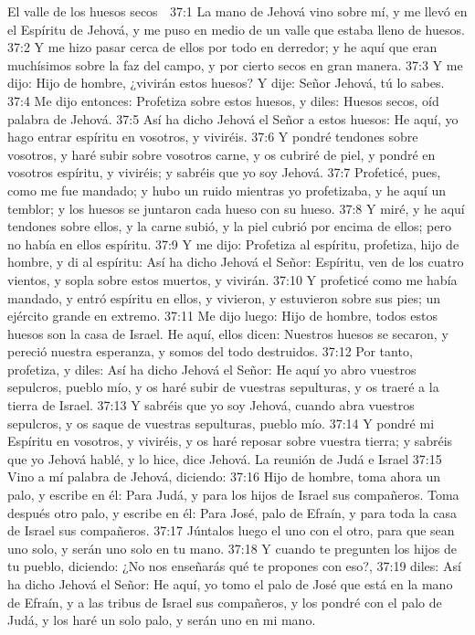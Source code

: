 El valle de los huesos secos  

37:1 La mano de Jehová vino sobre mí, y me llevó en el Espíritu de Jehová, y me puso en medio de un valle que estaba lleno de huesos.  
37:2 Y me hizo pasar cerca de ellos por todo en derredor; y he aquí que eran muchísimos sobre la faz del campo, y por cierto secos en gran manera.  
37:3 Y me dijo: Hijo de hombre, ¿vivirán estos huesos? Y dije: Señor Jehová, tú lo sabes.  
37:4 Me dijo entonces: Profetiza sobre estos huesos, y diles: Huesos secos, oíd palabra de Jehová.  
37:5 Así ha dicho Jehová el Señor a estos huesos: He aquí, yo hago entrar espíritu en vosotros, y viviréis.  
37:6 Y pondré tendones sobre vosotros, y haré subir sobre vosotros carne, y os cubriré de piel, y pondré en vosotros espíritu, y viviréis; y sabréis que yo soy Jehová.  
37:7 Profeticé, pues, como me fue mandado; y hubo un ruido mientras yo profetizaba, y he aquí un temblor; y los huesos se juntaron cada hueso con su hueso.  
37:8 Y miré, y he aquí tendones sobre ellos, y la carne subió, y la piel cubrió por encima de ellos; pero no había en ellos espíritu.  
37:9 Y me dijo: Profetiza al espíritu, profetiza, hijo de hombre, y di al espíritu: Así ha dicho Jehová el Señor: Espíritu, ven de los cuatro vientos, y sopla sobre estos muertos, y vivirán. 
37:10 Y profeticé como me había mandado, y entró espíritu en ellos, y vivieron, y estuvieron sobre sus pies; un ejército grande en extremo.  
37:11 Me dijo luego: Hijo de hombre, todos estos huesos son la casa de Israel. He aquí, ellos dicen: Nuestros huesos se secaron, y pereció nuestra esperanza, y somos del todo destruidos.  
37:12 Por tanto, profetiza, y diles: Así ha dicho Jehová el Señor: He aquí yo abro vuestros sepulcros, pueblo mío, y os haré subir de vuestras sepulturas, y os traeré a la tierra de Israel.  
37:13 Y sabréis que yo soy Jehová, cuando abra vuestros sepulcros, y os saque de vuestras sepulturas, pueblo mío.  
37:14 Y pondré mi Espíritu en vosotros, y viviréis, y os haré reposar sobre vuestra tierra; y sabréis que yo Jehová hablé, y lo hice, dice Jehová.  
La reunión de Judá e Israel  
37:15 Vino a mí palabra de Jehová, diciendo:  
37:16 Hijo de hombre, toma ahora un palo, y escribe en él: Para Judá, y para los hijos de Israel sus compañeros. Toma después otro palo, y escribe en él: Para José, palo de Efraín, y para toda la casa de Israel sus compañeros.  
37:17 Júntalos luego el uno con el otro, para que sean uno solo, y serán uno solo en tu mano.  
37:18 Y cuando te pregunten los hijos de tu pueblo, diciendo: ¿No nos enseñarás qué te propones con eso?,  
37:19 diles: Así ha dicho Jehová el Señor: He aquí, yo tomo el palo de José que está en la mano de Efraín, y a las tribus de Israel sus compañeros, y los pondré con el palo de Judá, y los haré un solo palo, y serán uno en mi mano.  
